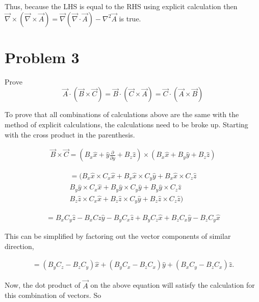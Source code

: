\documentclass[11pt]{article}
\begin{document}
Thus, because the LHS is equal to the RHS using explicit calculation then $\vec{\nabla} \times (\vec{\nabla} \times \vec{A}) 
= \vec{\nabla}(\vec{\nabla} \cdot \vec{A}) - \nabla^{2}\vec{A}$ is true.

\clearpage

\section*{Problem 3}

Prove 
$$
\vec{A} \cdot (\vec{B} \times \vec{C}) = 
\vec{B} \cdot (\vec{C} \times \vec{A}) = 
\vec{C} \cdot (\vec{A} \times \vec{B}) 
$$

To prove that all combinations of calculations above are the same with
the method of explicit calculations, the calculations need to be broke up. 
Starting with the cross product in the parenthesis. 

\begin{eqnarray*}
\vec{B} \times \vec{C} = 
(B_{x}\hat{x} + \hat{y}\frac{\partial}{\partial y} + B_{z}\hat{z}) \times
(B_{x}\hat{x} + B_{y}\hat{y} + B_{z}\hat{z}) 
\end{eqnarray*}

\begin{eqnarray*}
= ( 
B_{x}\hat{x} \times C_{x}\hat{x} + B_{x}\hat{x} \times C_{y}\hat{y} + B_{x}\hat{x} \times C_{z}\hat{z} \\
B_{y}\hat{y} \times C_{x}\hat{x} + B_{y}\hat{y} \times C_{y}\hat{y} + B_{y}\hat{y} \times C_{z}\hat{z} \\
B_{z}\hat{z} \times C_{x}\hat{x} + B_{z}\hat{z} \times C_{y}\hat{y} + B_{z}\hat{z} \times C_{z}\hat{z} 
) 
\end{eqnarray*}

\begin{eqnarray*}
= B_{x}C_{y}\hat{z} - B_{x}C{z}\hat{y} 
- B_{y}C_{x}\hat{z} + B_{y}C_{z}\hat{x} 
+ B_{z}C_{x}\hat{y} - B_{z}C_{y}\hat{x}
\end{eqnarray*}

This can be simplified by factoring out the vector components of similar direction,

\begin{eqnarray*}
= (B_{y}C_{z} - B_{z}C_{y})\hat{x} 
+ (B_{y}C_{x} - B_{z}C_{x})\hat{y}
+ (B_{x}C_{y} - B_{z}C_{x})\hat{z}.
\end{eqnarray*}

Now, the dot product of $\vec{A}$ on the above equation will satisfy 
the calculation for this combination of vectors. So 
\end{document}
